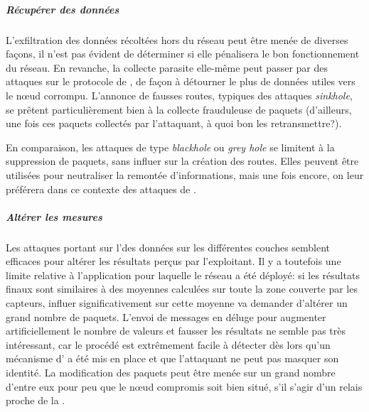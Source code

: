             \subparagraph{Récupérer des données}
L'exfiltration des données récoltées hors du réseau peut être menée de diverses façons, il n'est pas évident de déterminer si elle pénalisera le bon fonctionnement du réseau.
En revanche, la collecte parasite elle-même peut passer par des attaques sur le protocole de , de façon à détourner le plus de données utiles vers le nœud corrompu.
L'annonce de fausses routes, typiques des attaques \textit{sinkhole}, se prêtent particulièrement bien à la collecte frauduleuse de paquets (d'ailleurs, une fois ces paquets collectés par l'attaquant, à quoi bon les retransmettre?).

En comparaison, les attaques de type \textit{blackhole} ou \textit{grey hole} se limitent à la suppression de paquets, sans influer sur la création des routes.
Elles peuvent être utilisées pour neutraliser la remontée d'informations, mais une fois encore, on leur préférera dans ce contexte des attaques de .

            \subparagraph{Altérer les mesures}
Les attaques portant sur l'\integrite des données sur les différentes couches semblent efficaces pour altérer les résultats perçus par l'exploitant.
Il y a toutefois une limite relative à l'application pour laquelle le réseau a été déployé: si les résultats finaux sont similaires à des moyennes calculées sur toute la zone couverte par les capteurs, influer significativement sur cette moyenne va demander d'altérer un grand nombre de paquets.
L'envoi de messages en déluge pour augmenter artificiellement le nombre de valeurs et fausser les résultats ne semble pas très intéressant, car le procédé est extrêmement facile à détecter dès lors qu'un mécanisme d' a été mis en place et que l'attaquant ne peut pas masquer son identité.
La modification des paquets peut être menée sur un grand nombre d'entre eux pour peu que le nœud compromis soit bien situé, \cad s'il s'agir d'un relais proche de la \sdb.

